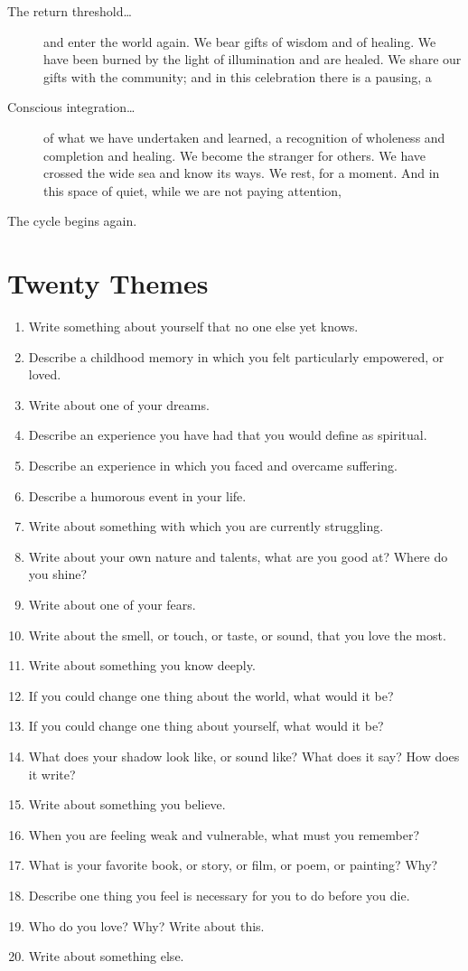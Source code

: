 \documentclass[letterpaper,oneside]{memoir}
\begin{document}
\begin{description}
\begin{description}
\item[The return threshold\ldots] and enter the world again. We bear gifts of wisdom and of healing. We have been burned by the light of illumination and are healed. We share our gifts with the community; and in this celebration there is a pausing, a 

\item[Conscious integration\ldots] of what we have undertaken and learned, a recognition of wholeness and completion and healing. We become the stranger for others. We have crossed the wide sea and know its ways. We rest, for a moment. And in this space of quiet, while we are not paying attention,

\item[The cycle begins again.]
\end{description}
\newpage
\section{Twenty Themes}
\begin{enumerate}
\item Write something about yourself that no one else yet knows.
\item Describe a childhood memory in which you felt particularly empowered, or loved.
\item Write about one of your dreams.
\item Describe an experience you have had that you would define as spiritual.
\item Describe an experience in which you faced and overcame suffering.
\item Describe a humorous event in your life.
\item Write about something with which you are currently struggling.
\item Write about your own nature and talents, what are you good at? Where do you shine?
\item Write about one of your fears.
\item Write about the smell, or touch, or taste, or sound, that you love the most.
\item Write about something you know deeply.
\item If you could change one thing about the world, what would it be?
\item If you could change one thing about yourself, what would it be?
\item What does your shadow look like, or sound like? What does it say? How does it write?
\item Write about something you believe.
\item When you are feeling weak and vulnerable, what must you remember?
\item What is your favorite book, or story, or film, or poem, or painting? Why?
\item Describe one thing you feel is necessary for you to do before you die.
\item Who do you love? Why? Write about this.
\item Write about something else.
\end{enumerate}
\newpage

\end{description}
\end{document}
